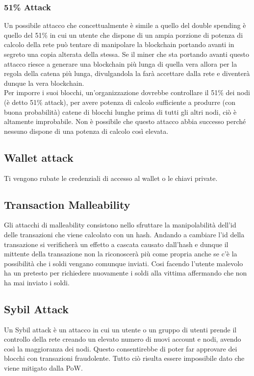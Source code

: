 \subsubsection{51\% Attack}

Un possibile attacco che concettualmente è simile a quello del double spending è
quello del 51\% in cui un utente che dispone di un ampia porzione di potenza di
calcolo della rete può tentare di manipolare la blockchain portando avanti in
segreto una copia alterata della stessa. Se il miner che sta portando avanti
questo attacco riesce a generare una blockchain più lunga di quella vera allora
per la regola della catena più lunga, divulgandola la farà accettare dalla rete
e diventerà dunque la vera blockchain.\\
Per imporre i suoi blocchi, un'organizzazione dovrebbe controllare il 51\% dei
nodi (è detto 51\% attack), per avere potenza di calcolo sufficiente a produrre
(con buona probabilità) catene di blocchi lunghe prima di tutti gli altri nodi,
ciò è altamente improbabile. Non è possibile che questo attacco abbia successo
perché nessuno dispone di una potenza di calcolo così elevata.

\subsection{Wallet attack}

Ti vengono rubate le credenziali di accesso al wallet o le chiavi private.

\subsection{Transaction Malleability }

Gli attacchi di malleability consistono nello sfruttare la manipolabilità
dell'id delle transazioni che viene calcolato con un hash. Andando a cambiare
l'id della transazione si verificherà un effetto a cascata causato dall'hash e
dunque il mittente della transazione non la riconoscerà più come propria anche
se c'è la possibilità che i soldi vengano comunque inviati. Cosi facendo
l'utente malevolo ha un pretesto per richiedere nuovamente i soldi alla vittima
affermando che non ha mai inviato i soldi.

\subsection{Sybil Attack}

Un Sybil attack è un attacco in cui un utente o un gruppo di utenti prende il
controllo della rete creando un elevato numero di nuovi account e nodi, avendo
così la maggioranza dei nodi. Questo consentirebbe di poter far approvare dei
blocchi con transazioni fraudolente. Tutto ciò risulta essere impossibile dato
che viene mitigato dalla PoW.
